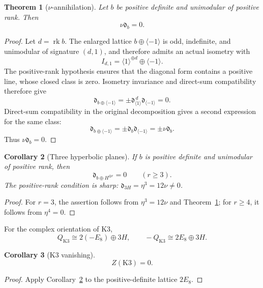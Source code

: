 \documentclass[11pt,a4paper]{amsart}
\newcommand{\dclass}{\mathfrak d}
\theoremstyle{plain}
\newtheorem{theorem}{Theorem}[section]
\newtheorem{corollary}[theorem]{Corollary}
\theoremstyle{definition}
\theoremstyle{remark}
\begin{document}
\begin{theorem}[$\nu$-annihilation]\label{thm:nu-annihilation}
Let $b$ be positive definite and unimodular of positive rank. Then
\begin{equation}\label{eq:nu-annihilation}
 \boxed{\nu\dclass_b=0.}
\end{equation}
\end{theorem}

\begin{proof}
Let $d=\operatorname{rk}b$. The enlarged lattice
$b\oplus\langle-1\rangle$ is odd, indefinite, and unimodular of
signature $(d,1)$, and therefore admits an actual isometry with
\[
 I_{d,1}=\langle1\rangle^{\oplus d}\oplus\langle-1\rangle.
\]
The positive-rank hypothesis ensures that the diagonal form contains a
positive line, whose closed class is zero. Isometry invariance and
direct-sum compatibility therefore give
\[
 \dclass_{b\oplus\langle-1\rangle}
 =\pm\dclass_{\langle1\rangle}^{\,d}\dclass_{\langle-1\rangle}=0.
\]
Direct-sum compatibility in the original decomposition gives a second
expression for the same class:
\[
 \dclass_{b\oplus\langle-1\rangle}
 =\pm\dclass_b\dclass_{\langle-1\rangle}
 =\pm\nu\dclass_b.
\]
Thus $\nu\dclass_b=0$.
\end{proof}

\begin{corollary}[Three hyperbolic planes]\label{cor:three-H}
If $b$ is positive definite and unimodular of positive rank, then
\[
 \dclass_{b\oplus H^{\oplus r}}=0
 \qquad(r\ge3).
\]
The positive-rank condition is sharp:
$\dclass_{3H}=\eta^3=12\nu\ne0$.
\end{corollary}

\begin{proof}
For $r=3$, the assertion follows from $\eta^3=12\nu$ and
Theorem~\ref{thm:nu-annihilation}; for $r\ge4$, it follows from
$\eta^4=0$.
\end{proof}

For the complex orientation of K3,
\[
 Q_{\mathrm{K3}}\cong2(-E_8)\oplus3H,
 \qquad
 -Q_{\mathrm{K3}}\cong2E_8\oplus3H.
\]

\begin{corollary}[K3 vanishing]\label{cor:K3}
\[
 \boxed{Z(\mathrm{K3})=0.}
\]
\end{corollary}

\begin{proof}
Apply Corollary~\ref{cor:three-H} to the positive-definite
lattice $2E_8$.
\end{proof}
\end{document}
